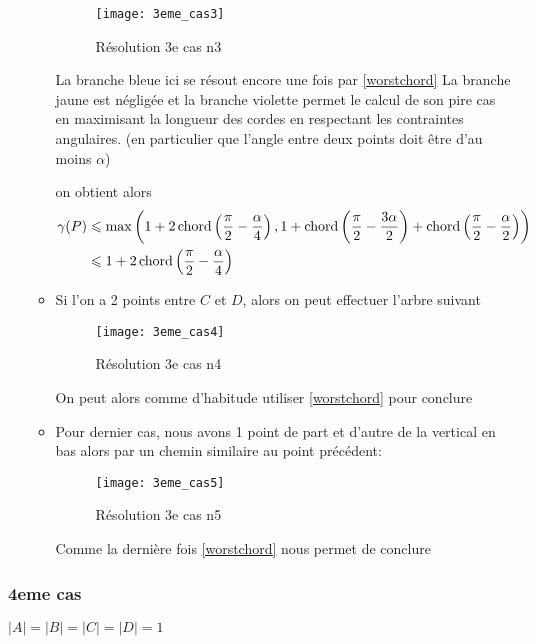 \begin{itemize}
\begin{itemize}
\begin{figure}[h!]
  \centering
  \texttt{[image: 3eme\_cas3]}
  \caption{Résolution 3e cas n3}
  \label{fig:3eme_cas3}
\end{figure}

La branche bleue ici se résout encore une fois par \ref{worstchord}
La branche jaune est négligée
et la branche violette permet le calcul de son pire cas en maximisant la longueur des cordes en respectant les contraintes angulaires. (en particulier que l'angle entre deux points doit être d'au moins $\alpha$)

on obtient alors
\begin{align*}
\gamma(P) &\leqslant \max\left(1+2\operatorname{chord}\left(\frac{\pi}{2} - \frac{\alpha}{4}\right), 1 + \operatorname{chord}\left(\frac{\pi}{2} - \frac{3\alpha}{2}\right) + \operatorname{chord}\left(\frac{\pi}{2} - \frac{\alpha}{2}\right)\right) \\
&\leqslant 1+2\operatorname{chord}\left(\frac{\pi}{2} - \frac{\alpha}{4}\right)
\end{align*}

\item Si l'on a 2 points entre $C$ et $D$, alors on peut effectuer l'arbre suivant

\begin{figure}[h!]
  \centering
  \texttt{[image: 3eme\_cas4]}
  \caption{Résolution 3e cas n4}
  \label{fig:3eme_cas4}
\end{figure}

On peut alors comme d'habitude utiliser \ref{worstchord} pour conclure

\item Pour dernier cas, nous avons 1 point de part et d'autre de la vertical en bas alors par un chemin similaire au point précédent:

\begin{figure}[h!]
  \centering
  \texttt{[image: 3eme\_cas5]}
  \caption{Résolution 3e cas n5}
  \label{fig:3eme_cas5}
\end{figure}

Comme la dernière fois \ref{worstchord} nous permet de conclure

\end{itemize}
\end{itemize}

\subsubsection*{4eme cas} $|A| = |B| = |C| = |D| = 1$


